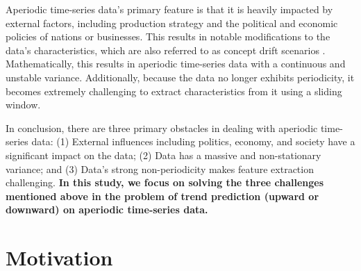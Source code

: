 Aperiodic time-series data's primary feature is that it is heavily impacted by external factors, including production strategy and the political and economic policies of nations or businesses. This results in notable modifications to the data's characteristics, which are also referred to as concept drift scenarios \cite{liu2025onsitnet}. Mathematically, this results in aperiodic time-series data with a continuous and unstable variance. Additionally, because the data no longer exhibits periodicity, it becomes extremely challenging to extract characteristics from it using a sliding window.


In conclusion, there are three primary obstacles in dealing with aperiodic time-series data: (1) External influences including politics, economy, and society have a significant impact on the data; (2) Data has a massive and non-stationary variance; and (3) Data's strong non-periodicity makes feature extraction challenging. \textbf{In this study, we focus on solving the three challenges mentioned above in the problem of trend prediction (upward or downward) on aperiodic time-series data.}

\section{Motivation}
\label{sec:moti}


